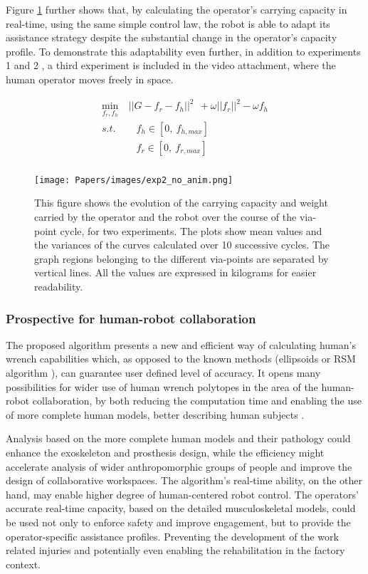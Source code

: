 Figure \ref{fig:experiment_results} further shows that, by calculating the operator's carrying capacity in real-time, { using the same simple control law, the robot is able to adapt its assistance strategy despite the substantial change in the operator's capacity profile.}
To demonstrate this adaptability even further, in addition to  experiments 1 and 2 , a third experiment is included in the video attachment, where the human operator moves freely in space. 

\begin{equation}
\begin{split}
    \min_{f_r,f_h} &~||G - f_r -f_h||^2 ~~+ \omega||f_r||^2 - \omega f_h\\
    s.t.& \quad f_h \in[0, ~f_{h,max}]\\
    & \quad f_r \in[0, ~f_{r,max}]\\
\end{split}
\end{equation}


\begin{figure}[!t]
    \centering
    \texttt{[image: Papers/images/exp2\_no\_anim.png]}
    \caption{This figure shows the evolution of the carrying capacity and weight carried by the operator and the robot over the course of the via-point cycle, for two experiments. The plots show mean values and the variances of the curves calculated over 10 successive cycles. The graph regions belonging to the different via-points are separated by vertical lines.  All the values are expressed in kilograms for easier readability.}
    \label{fig:experiment_results}
\end{figure}

\subsubsection{Prospective for human-robot collaboration}
The proposed algorithm presents a new and efficient way of calculating human's wrench capabilities which, as opposed to the known methods (ellipsoids \cite{yoshikawa1985manipulability}\cite{sasaki2011vertex} or RSM algorithm \cite{carmichael2011Towards}), can guarantee user defined level of accuracy. It opens many possibilities for wider use of human wrench polytopes in the area of the human-robot collaboration, by both reducing the computation time and enabling the use of more complete human models, better describing human subjects \cite{sohn2019effects}.

Analysis based on the more complete human models and their pathology could enhance the exoskeleton and prosthesis design, while the efficiency might accelerate analysis of wider anthropomorphic groups of people and improve the design of collaborative workspaces. The algorithm's real-time ability, on the other hand, may enable higher degree of human-centered robot control. The operators' accurate real-time capacity, based on the detailed musculoskeletal models, could be used not only to enforce safety and improve engagement, but to provide the operator-specific assistance profiles. Preventing the development of the work related injuries and potentially even enabling the rehabilitation in the factory context.

